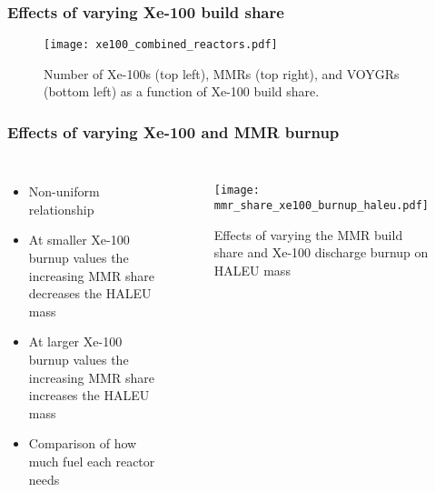 \begin{frame}
    \frametitle{Effects of varying Xe-100 build share}
    \begin{figure}
        \centering
        \texttt{[image: xe100\_combined\_reactors.pdf]}
        \caption{Number of Xe-100s (top left), MMRs (top right), and VOYGRs
        (bottom left) as a function of Xe-100 build share.}
        \label{fig:xe100_s7_combined_reactors}
    \end{figure}
\end{frame}

\begin{frame}
    \frametitle{Effects of varying Xe-100 and MMR burnup}
    \begin{columns}

        \column[t]{4cm}
        \begin{itemize}
            \item Non-uniform relationship
            \item At smaller Xe-100 burnup values the increasing MMR 
                  share decreases the HALEU mass
            \item At larger Xe-100 burnup values the increasing MMR share 
                  increases the HALEU mass
            \item Comparison of how much fuel each reactor needs
        \end{itemize}

    \column[t]{6cm}
    \vspace{-1cm}
    \begin{figure}
        \centering 
            \texttt{[image: mmr\_share\_xe100\_burnup\_haleu.pdf]}
            \caption{Effects of varying the MMR build share and 
            Xe-100 discharge burnup on HALEU mass}
            \label{fig:mmr_share_xe100_bu}
    \end{figure}

\end{columns}
\end{frame}

